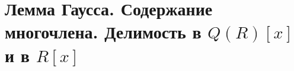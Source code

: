 \section{
 \texorpdfstring{Лемма Гаусса. Содержание многочлена. Делимость в $Q(R)[x]$ и в $R[x]$}.
}
